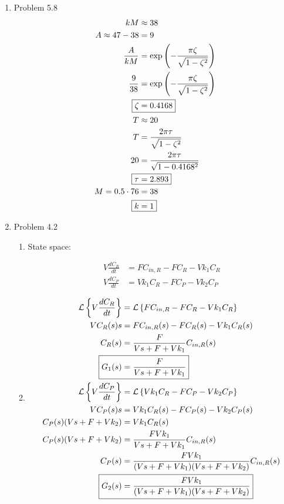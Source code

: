 \documentclass[12pt]{article}
\begin{document}
\begin{enumerate}
\newpage
\item Problem 5.8
\begin{align*}
    kM &\approx 38 \\
    A \approx 47 - 38 &= 9 \\
    \frac{A}{kM} &= \exp{\left(-\frac{\pi\zeta}{\sqrt{1 - \zeta^2}}\right)} \\
    \frac{9}{38} &= \exp{\left(-\frac{\pi\zeta}{\sqrt{1 - \zeta^2}}\right)} \\
    \Aboxed{\zeta &= 0.4168} \\
    T &\approx 20 \\
    T &= \frac{2\pi\tau}{\sqrt{1 - \zeta^2}} \\
    20 &= \frac{2\pi\tau}{\sqrt{1 - 0.4168^2}} \\
    \Aboxed{\tau &= 2.893} \\
    M = 0.5 \cdot 76 &= 38 \\
    \Aboxed{k &= 1}
\end{align*}

\newpage
\item Problem 4.2

\begin{enumerate}
    \item 
    
    State space:

    \begin{align*}
        V \frac{dC_R}{dt} &= F C_{in,R} - F C_R - V k_1 C_R \\
        V \frac{dC_P}{dt} &= V k_1 C_R - F C_P - V k_2 C_P
    \end{align*}
    
    
    \item
    \begin{align*}
        \mathcal{L}\left\{V \frac{dC_R}{dt}\right\} &= \mathcal{L}\left\{F C_{in,R} - F C_R - V k_1 C_R\right\} \\
        V C_R(s) s &= F C_{in,R}(s) - F C_R(s) - Vk_1C_R(s) \\
        C_R(s) &= \frac{F}{Vs + F + Vk_1} C_{in,R}(s) \\
        \Aboxed{G_1(s) &= \frac{F}{Vs + F + Vk_1}} \\
        \mathcal{L}\left\{V \frac{dC_P}{dt}\right\} &= \mathcal{L}\left\{V k_1 C_R - F C_P - V k_2 C_P\right\} \\
        V C_P(s) s &= V k_1 C_R(s) - F C_P(s) - V k_2 C_P(s) \\
        C_P(s) (V s + F + V k_2) &= V k_1 C_R(s) \\
        C_P(s) (V s + F + V k_2) &= \frac{F V k_1}{Vs + F + Vk_1} C_{in,R}(s) \\
        C_P(s) &= \frac{F V k_1}{(Vs + F + Vk_1) (V s + F + V k_2)} C_{in,R}(s) \\
        \Aboxed{G_2(s) &= \frac{F V k_1}{(Vs + F + Vk_1) (V s + F + V k_2)}}
    \end{align*}


\end{enumerate}
\end{enumerate}
\end{document}
